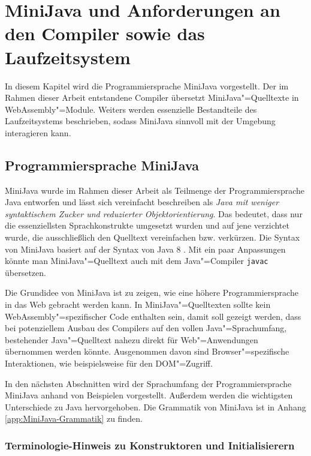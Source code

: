 \chapter{MiniJava und Anforderungen an den Compiler sowie das Laufzeitsystem}
\label{cha:MiniJava}

In diesem Kapitel wird die Programmiersprache MiniJava vorgestellt. Der im Rahmen dieser Arbeit entstandene Compiler übersetzt MiniJava"=Quelltexte in WebAssembly"=Module. Weiters werden essenzielle Bestandteile des Laufzeitsystems beschrieben, sodass MiniJava sinnvoll mit der Umgebung interagieren kann.

\section{Programmiersprache MiniJava}
\label{sec:Programmiersprache-MiniJava}

MiniJava wurde im Rahmen dieser Arbeit als Teilmenge der Programmiersprache Java entworfen und lässt sich vereinfacht beschreiben als \emph{Java mit weniger syntaktischem Zucker und reduzierter Objektorientierung}. Das bedeutet, dass nur die essenziellsten Sprachkonstrukte umgesetzt wurden und auf jene verzichtet wurde, die ausschließlich den Quelltext vereinfachen bzw. verkürzen. Die Syntax von MiniJava basiert auf der Syntax von Java 8 \cite{Java8Specification}. Mit ein paar Anpassungen könnte man MiniJava"=Quelltext auch mit dem Java"=Compiler \lstinline{javac} übersetzen.

Die Grundidee von MiniJava ist zu zeigen, wie eine höhere Programmiersprache in das Web gebracht werden kann. In MiniJava"=Quelltexten sollte kein WebAssembly"=spezifischer Code enthalten sein, damit soll gezeigt werden, dass bei potenziellem Ausbau des Compilers auf den vollen Java"=Sprachumfang, bestehender Java"=Quelltext nahezu direkt für Web"=Anwendungen übernommen werden könnte. Ausgenommen davon sind Browser"=spezifische Interaktionen, wie beispielsweise für den DOM"=Zugriff.

In den nächsten Abschnitten wird der Sprachumfang der Programmiersprache MiniJava anhand von Beispielen vorgestellt. Außerdem werden die wichtigsten Unterschiede zu Java hervorgehoben. Die Grammatik von MiniJava ist in Anhang \ref{app:MiniJava-Grammatik} zu finden.

\pagebreak
\subsection{Terminologie-Hinweis zu Konstruktoren und Initialisierern}

